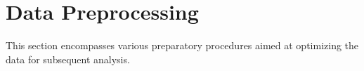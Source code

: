 \documentclass[
	article, %
	11pt, %
	draft, %
]{CSUniSchoolLabReport}
\begin{document}











\section{Data Preprocessing}\label{data_preprocessing}

This section encompasses various preparatory procedures aimed at optimizing the data for subsequent analysis.
\end{document}
